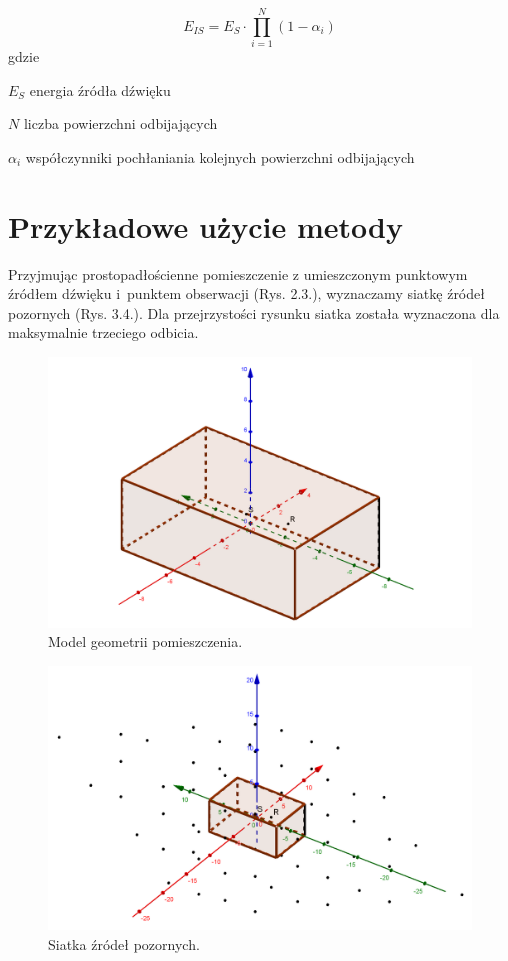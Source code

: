 \begin{equation}
E_{IS}=E_{S}\cdot\prod_{i=1}^{N}(1-\alpha_i)
\end{equation}
gdzie
\begin{eqwhere}[2cm]
        \item[$E_{S}$] energia źródła dźwięku
        \item[$N$] liczba powierzchni odbijających
        \item[$\alpha_i$] współczynniki pochłaniania kolejnych powierzchni odbijających
\end{eqwhere}


\section{Przykładowe użycie metody}\label{sec:przyuzy}

Przyjmując prostopadłościenne pomieszczenie z umieszczonym punktowym źródłem dźwięku i~punktem obserwacji (Rys. 2.3.), wyznaczamy siatkę źródeł pozornych (Rys. 3.4.). Dla przejrzystości rysunku siatka została wyznaczona dla maksymalnie trzeciego odbicia.
 
\begin{figure}[h]
        \centering
                \centering
                \includegraphics[width=12cm]{rys3}
	\caption{Model geometrii pomieszczenia.}
\end{figure}

\begin{figure}[h]
        \centering
                \centering
                \includegraphics[width=12cm]{rys4}
	\caption{Siatka źródeł pozornych.}
\end{figure}


